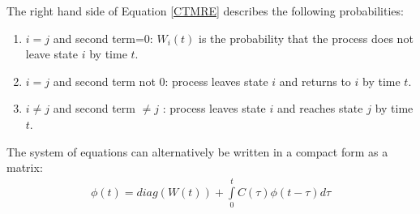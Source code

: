 The right hand side of Equation \ref{CTMRE} describes the following probabilities:
\begin{enumerate}
\item	$i=j$ and second term=0: $W_i (t)$ is the probability that the process does not leave state $i$ by time $t$.
\item	$i=j$ and second term not 0: process leaves state $i$ and returns to $i$ by time $t$.
\item	$i \neq j$  and second term $\neq j$ : process leaves state $i$ and reaches state $j$ by time $t$.
\end{enumerate}
The system of equations can alternatively be written in a compact form as a matrix:
\begin{align}
{\phi(t)} = diag(W(t)) + {\int\limits_0^t {C(\tau ){\phi (t - \tau )}d\tau } } 
\label{MatMRE}
\end{align}




